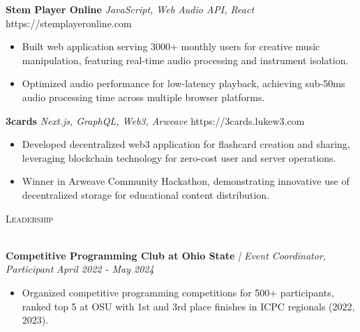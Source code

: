 \documentclass[letterpaper]{article}
\newcommand{\lineunder} {
    \vspace*{-8pt} \\
    \hspace*{-18pt} \hrulefill \\
}
\newcommand{\header} [1] {
    {\hspace*{-18pt}\vspace*{6pt} \textsc{#1}}
    \vspace*{-6pt} \lineunder
}
\begin{document}
    {\textbf{Stem Player Online}} {\sl JavaScript, Web Audio API, React} \hfill https://stemplayeronline.com\\
    \vspace{-2mm}
    \begin{itemize} \itemsep -1mm

        \item Built web application serving 3000+ monthly users for creative music manipulation, featuring real-time audio processing and instrument isolation.
        
        \item Optimized audio performance for low-latency playback, achieving sub-50ms audio processing time across multiple browser platforms.
        
    \end{itemize}
    \vspace{-2mm}

    {\textbf{3cards}} {\sl Next.js, GraphQL, Web3, Arweave} \hfill https://3cards.lukew3.com\\
    \vspace{-2mm}
    \begin{itemize} \itemsep -1mm

        \item Developed decentralized web3 application for flashcard creation and sharing, leveraging blockchain technology for zero-cost user and server operations.
        
        \item Winner in Arweave Community Hackathon, demonstrating innovative use of decentralized storage for educational content distribution.
            
    \end{itemize}
    \vspace{-2mm}

\header{Leadership}
\vspace{1mm}

    \textbf{Competitive Programming Club at Ohio State} \textit{| Event Coordinator, Participant} \hfill \textsl{April 2022 - May 2024}\\
    \vspace{-2mm}
    \begin{itemize} \itemsep -1mm
    
        \item Organized competitive programming competitions for 500+ participants, ranked top 5 at OSU with 1st and 3rd place finishes in ICPC regionals (2022, 2023).

    \end{itemize}
    \vspace{-1mm}
\end{document}
